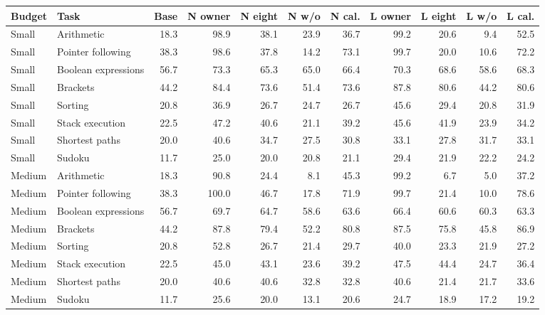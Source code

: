 \begin{tabular}{@{}llrrrrrrrrr@{}}
\toprule
Budget & Task & Base & N owner & N eight & N w/o & N cal. & L owner & L eight & L w/o & L cal.\\
\midrule
Small & Arithmetic & 18.3 & 98.9 & 38.1 & 23.9 & 36.7 & 99.2 & 20.6 & 9.4 & 52.5\\
Small & Pointer following & 38.3 & 98.6 & 37.8 & 14.2 & 73.1 & 99.7 & 20.0 & 10.6 & 72.2\\
Small & Boolean expressions & 56.7 & 73.3 & 65.3 & 65.0 & 66.4 & 70.3 & 68.6 & 58.6 & 68.3\\
Small & Brackets & 44.2 & 84.4 & 73.6 & 51.4 & 73.6 & 87.8 & 80.6 & 44.2 & 80.6\\
Small & Sorting & 20.8 & 36.9 & 26.7 & 24.7 & 26.7 & 45.6 & 29.4 & 20.8 & 31.9\\
Small & Stack execution & 22.5 & 47.2 & 40.6 & 21.1 & 39.2 & 45.6 & 41.9 & 23.9 & 34.2\\
Small & Shortest paths & 20.0 & 40.6 & 34.7 & 27.5 & 30.8 & 33.1 & 27.8 & 31.7 & 33.1\\
Small & Sudoku & 11.7 & 25.0 & 20.0 & 20.8 & 21.1 & 29.4 & 21.9 & 22.2 & 24.2\\
\midrule
Medium & Arithmetic & 18.3 & 90.8 & 24.4 & 8.1 & 45.3 & 99.2 & 6.7 & 5.0 & 37.2\\
Medium & Pointer following & 38.3 & 100.0 & 46.7 & 17.8 & 71.9 & 99.7 & 21.4 & 10.0 & 78.6\\
Medium & Boolean expressions & 56.7 & 69.7 & 64.7 & 58.6 & 63.6 & 66.4 & 60.6 & 60.3 & 63.3\\
Medium & Brackets & 44.2 & 87.8 & 79.4 & 52.2 & 80.8 & 87.5 & 75.8 & 45.8 & 86.9\\
Medium & Sorting & 20.8 & 52.8 & 26.7 & 21.4 & 29.7 & 40.0 & 23.3 & 21.9 & 27.2\\
Medium & Stack execution & 22.5 & 45.0 & 43.1 & 23.6 & 39.2 & 47.5 & 44.4 & 24.7 & 36.4\\
Medium & Shortest paths & 20.0 & 40.6 & 40.6 & 32.8 & 32.8 & 40.6 & 21.4 & 21.7 & 33.6\\
Medium & Sudoku & 11.7 & 25.6 & 20.0 & 13.1 & 20.6 & 24.7 & 18.9 & 17.2 & 19.2\\
\bottomrule
\end{tabular}
